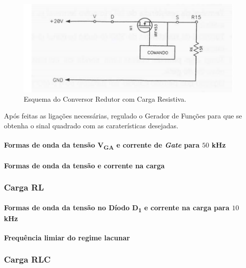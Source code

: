 \documentclass[a4paper,11pt]{article}
\numberwithin{equation}{section}
\begin{document}
\begin{figure}[h]
	\centering
	\includegraphics[keepaspectratio=true, scale=0.8]{teoricas/Redutor R.png}
	\caption{Esquema do Conversor Redutor com Carga Resistiva.}
	\label{fig:Red R}
	\vspace{-0.8em}
\end{figure}

	Após feitas as ligações necessárias, regulado o Gerador de Funções para que se obtenha o sinal quadrado com as caraterísticas desejadas.
	
\paragraph{Formas de onda da tensão V\textsubscript{GA} e corrente de \textit{Gate} para $50$ kHz}

\paragraph{Formas de onda da tensão e corrente na carga}

\subsubsection{Carga RL}

\paragraph{Formas de onda da tensão no Díodo D\textsubscript{1} e corrente na carga para $10$ kHz}

\paragraph{Frequência limiar do regime lacunar}

\subsubsection{Carga RLC}
\end{document}
